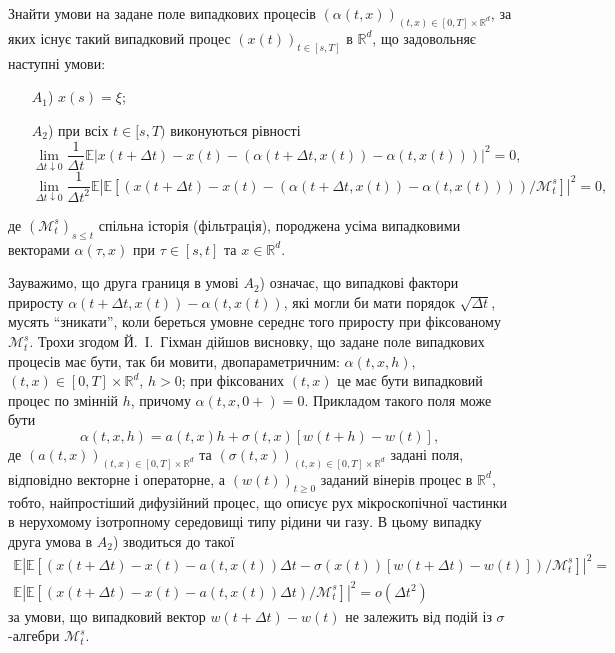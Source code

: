 \documentclass[11pt, reqno]{amsart}
\begin{document}
Знайти умови на задане поле випадкових процесів $(\alpha(t,x))_{(t,x)\in[0,T]\times\mathbb{R}^d}$, за яких існує такий випадковий процес $(x(t))_{t\in[s,T]}$ в $\mathbb{R}^d$, що задовольняє наступні умови:
\begin{enumerate}
	\item[$A_1$)] $x(s)=\xi$;
	\item[$A_2$)] при всіх $t\in[s,T)$ виконуються рівності
	\[
	\lim_{\Delta t\downarrow0}\frac{1}{\Delta t}\mathbb{E} \left|x(t+\Delta t)-x(t)-(\alpha(t+\Delta t,x(t))-\alpha(t,x(t)))\right|^2=0,
	\]
	\[
	\lim_{\Delta t\downarrow0}\frac{1}{\Delta t^2}\mathbb{E} \left|\mathbb{E}\left[\left( x(t+\Delta t)-x(t)-(\alpha(t+\Delta t,x(t))-\alpha(t,x(t)))\right)/\mathcal{M}_t^s\right]\right|^2=0,
	\]
\end{enumerate}
де $(\mathcal{M}_t^s)_{s\le t}$ спільна історія (фільтрація), породжена усіма випадковими векторами $\alpha(\tau,x)$ при $\tau\in[s,t]$ та $x\in\mathbb{R}^d$.

Зауважимо, що друга границя в умові $A_2$) означає, що випадкові фактори приросту $\alpha(t+\Delta t,x(t))-\alpha(t,x(t))$, які могли би мати порядок $\sqrt{\Delta t}$, мусять ``зникати'', коли береться умовне середнє того приросту при фіксованому $\mathcal{M}_t^s$. Трохи згодом Й.~І.~Гіхман дійшов висновку, що задане поле випадкових процесів має бути, так би мовити, двопараметричним: $\alpha(t,x,h)$, $(t,x)\in[0,T]\times\mathbb{R}^d$, $h>0$; при фіксованих $(t,x)$ це має бути випадковий процес по змінній $h$, причому $\alpha(t,x,0+)=0$. Прикладом такого поля може бути
\begin{equation}
\label{f5}
\alpha(t,x,h)=a(t,x)h+\sigma(t,x)[w(t+h)-w(t)],
\end{equation}
де $(a(t,x))_{(t,x)\in[0,T]\times\mathbb{R}^d}$ та $(\sigma(t,x))_{(t,x)\in[0,T]\times\mathbb{R}^d}$ задані поля, відповідно векторне і операторне, а $(w(t))_{t\ge0}$ заданий вінерів процес в $\mathbb{R}^d$, тобто, найпростіший дифузійний процес, що описує рух мікроскопічної частинки в нерухомому ізотропному середовищі типу рідини чи газу. В цьому випадку друга умова в $A_2$) зводиться до такої
\[
\begin{split}
\mathbb{E} |\mathbb{E} [\left(x(t+\Delta t)-x(t)-a(t, x(t))\Delta t - \sigma(x(t))[w(t+\Delta t)- w(t)]\right)/ \mathcal{M}_{t}^{s}]|^{2}= \\\mathbb{E}|\mathbb{E} [\left(x(t+\Delta t)-x(t)-a(t, x(t))\Delta t \right)/ \mathcal{M}_{t}^{s}] |^{2}= o \left(\Delta t^2 \right)
\end{split}
\]
за умови, що випадковий вектор $w(t+\Delta t) - w(t)$ не залежить від подій із $\sigma$-алгебри $\mathcal{M}_{t}^{s}$.
\end{document}
